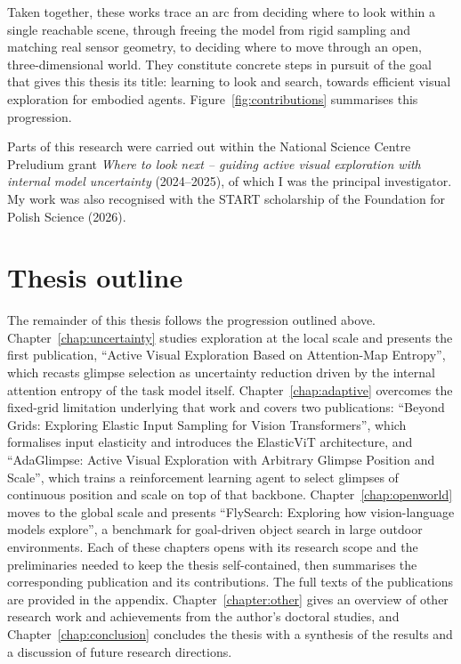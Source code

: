 Taken together, these works trace an arc from deciding where to look within a single reachable
scene, through freeing the model from rigid sampling and matching real sensor geometry, to deciding where to move through an open, three-dimensional world. They constitute concrete steps in pursuit of the
goal that gives this thesis its title: learning to look and search, towards efficient visual
exploration for embodied agents. Figure~\ref{fig:contributions} summarises this progression.

Parts of this research were carried out within the National Science Centre Preludium grant \emph{Where to look next -- guiding active visual exploration with internal model uncertainty} (2024--2025), of which I was the principal investigator. My work was also recognised with the START scholarship of the Foundation for Polish Science (2026).

\section{Thesis outline}

The remainder of this thesis follows the progression outlined above.
Chapter~\ref{chap:uncertainty} studies exploration at the local scale and presents the first publication, ``Active Visual Exploration Based on Attention-Map Entropy'', which recasts glimpse selection as uncertainty reduction driven by the internal attention entropy of the task model itself.
Chapter~\ref{chap:adaptive} overcomes the fixed-grid limitation underlying that work and covers two publications: ``Beyond Grids: Exploring Elastic Input Sampling for Vision Transformers'', which formalises input elasticity and introduces the ElasticViT architecture, and ``AdaGlimpse: Active Visual Exploration with Arbitrary Glimpse Position and Scale'', which trains a reinforcement learning agent to select glimpses of continuous position and scale on top of that backbone.
Chapter~\ref{chap:openworld} moves to the global scale and presents ``FlySearch: Exploring how vision-language models explore'', a benchmark for goal-driven object search in large outdoor environments.
Each of these chapters opens with its research scope and the preliminaries needed to keep the thesis self-contained, then summarises the corresponding publication and its contributions. The full texts of the publications are provided in the appendix.
Chapter~\ref{chapter:other} gives an overview of other research work and achievements from the author's doctoral studies, and Chapter~\ref{chap:conclusion} concludes the thesis with a synthesis of the results and a discussion of future research directions.
